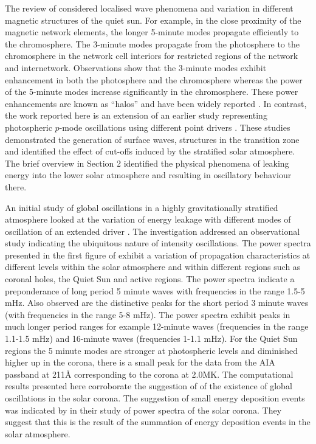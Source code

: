 \documentclass[physics,article,submit,pdftex,moreauthors]{Definitions/mdpi}
\begin{document}
The  review of \cite{Khomenko2013} considered localised wave phenomena and variation in different magnetic structures of the quiet sun. For example, in the close proximity of the magnetic network elements, the longer 5-minute modes propagate efficiently to the chromosphere. The 3-minute modes propagate from the photosphere to the chromosphere in the network cell interiors for restricted regions of the network and internetwork.  Observations show that the 3-minute modes exhibit enhancement in both the photosphere and the chromosphere whereas the power of the 5-minute modes increase significantly in the chromosphere. These power enhancements are known as “halos” and have been widely reported \cite{Kontogiannis2010}. 
In contrast, the work reported here is an extension of an earlier study representing photospheric $p$-mode oscillations using different point drivers  \cite{Malins2007}. These studies demonstrated  the generation of surface waves, structures in the transition zone and identified the effect of cut-offs induced by the stratified  solar atmosphere. The  brief overview in Section 2 identified the physical phenomena of leaking energy into the lower solar atmosphere and resulting in oscillatory behaviour there.

An initial study of global oscillations in a highly gravitationally stratified atmosphere looked at the variation of energy leakage with different modes of oscillation of an extended driver \cite{Griffiths2018b}. The investigation addressed an observational study indicating the ubiquitous nature of intensity oscillations. The power spectra presented in the first figure of \cite{Griffiths2018b} exhibit a variation of propagation characteristics at different levels within the solar atmosphere and within different regions such as coronal holes, the Quiet Sun and active regions. The power spectra indicate a preponderance of long period 5 minute waves with frequencies in the range 1.5-5 mHz. Also observed are the distinctive peaks for the short period 3 minute waves (with frequencies in the range 5-8 mHz). The power spectra exhibit  peaks in much longer period ranges for example 12-minute waves  (frequencies in the range 1.1-1.5 mHz)  and 16-minute waves (frequencies 1-1.1 mHz). For the Quiet Sun regions the 5 minute modes are stronger at photospheric levels and diminished higher up in the corona, there is a small peak for the data from the AIA passband at 211{\AA} corresponding to the corona at 2.0MK.  The computational results presented here corroborate the suggestion of \cite{Didkovsky2013} of the existence of global oscillations in the solar corona. The suggestion of small energy deposition events was indicated by \cite{Ireland2015} in their study of power spectra of the solar corona. They suggest that this is the result of the summation of energy deposition events in the solar atmosphere.
\end{document}
